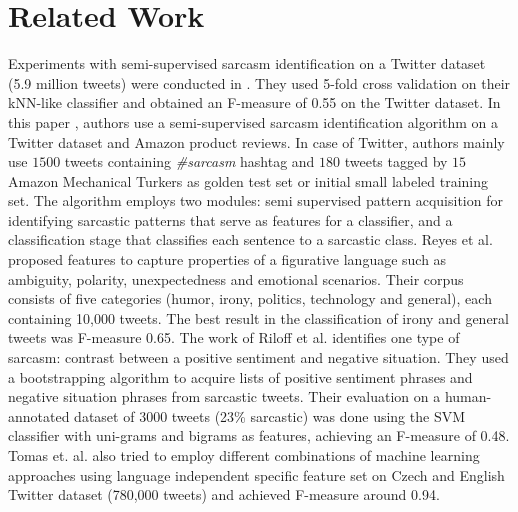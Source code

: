 \section{Related Work}
\label{sec:related}
Experiments with semi-supervised sarcasm identification on a Twitter dataset (5.9 million tweets) were conducted in \cite{davidov10}. They used 5-fold cross validation on their kNN-like classifier and obtained an F-measure of 0.55 on the Twitter dataset. In this paper \cite{davidov10}, authors use a semi-supervised sarcasm identification algorithm on a Twitter dataset and Amazon product reviews. In case of Twitter, authors mainly use $1500$ tweets containing \textit{\#sarcasm} hashtag and $180$ tweets tagged by $15$ Amazon Mechanical Turkers \cite{mturk} as golden test set or initial small labeled training set. The algorithm employs two modules: semi supervised pattern acquisition for identifying sarcastic patterns that serve as features for a classifier, and a classification stage that classifies each sentence to a sarcastic class. Reyes et al. \cite{reyes12} proposed features to capture properties of a figurative language such as ambiguity, polarity, unexpectedness and emotional scenarios. Their corpus consists of five categories (humor, irony, politics, technology and general), each containing 10,000 tweets. The best result in the classification of
irony and general tweets was F-measure 0.65. The work of Riloff et al. \cite{riloff13} identifies one type of sarcasm: contrast between a positive sentiment and negative situation. They used a bootstrapping algorithm to acquire lists of positive sentiment phrases and negative situation phrases from sarcastic tweets. Their evaluation on a human-annotated dataset of 3000 tweets (23\% sarcastic) was done using the SVM classifier with uni-grams and bigrams as features, achieving an F-measure of 0.48. Tomas et. al. \cite{tomas14} also tried to employ different combinations of machine learning approaches using language independent specific feature set on Czech and English Twitter dataset (780,000 tweets) and achieved F-measure around 0.94.